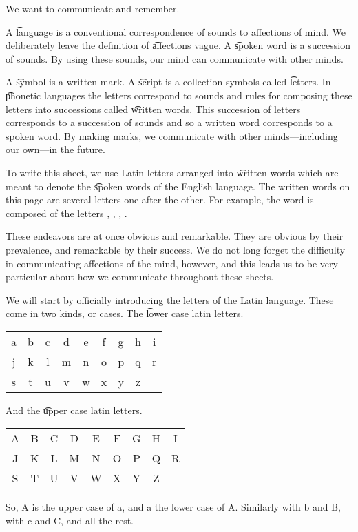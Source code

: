 

We want to communicate and remember.


A \t{language} is a conventional correspondence of sounds to affections of mind.
We deliberately leave the definition of \t{affections} vague.
A \t{spoken word} is a succession of sounds.
By using these sounds, our mind can communicate with other minds.

A \t{symbol} is a written mark.
A \t{script} is a collection symbols called \t{letters}.
In \t{phonetic} languages the letters correspond to sounds and rules for composing these letters into successions called \t{written words}.
This succession of letters corresponds to a succession of sounds and so a written word corresponds to a spoken word.
By making marks, we communicate with other minds---including our own---in the future.

To write this sheet, we use Latin letters arranged into \t{written words} which are meant to denote the \t{spoken words} of the English language.
The written words on this page are several letters one after the other.
For example, the word  is composed of the letters , , , .

These endeavors are at once obvious and remarkable.
They are obvious by their prevalence, and remarkable by their success.
We do not long forget the difficulty in communicating affections of the mind, however, and this leads us to be very particular about how we communicate throughout these sheets.


We will start by officially introducing the letters of the Latin language.
These come in two kinds, or cases.
The \t{lower case latin letters}.
\begin{center}
\begin{tabular}{ccccccccc}
  a & b & c & d & e & f & g & h & i \\
  j & k & l & m & n & o & p & q & r \\
  s & t & u & v & w & x & y & z &   \\
\end{tabular}
\end{center}
And the \t{upper case latin letters}.
\begin{center}
\begin{tabular}{ccccccccc}
  A & B & C & D & E & F & G & H & I \\
  J & K & L & M & N & O & P & Q & R \\
  S & T & U & V & W & X & Y & Z &   \\
\end{tabular}
\end{center}
So, A is the upper case of a, and a the lower case of A.
Similarly with b and B, with c and C, and all the rest.

